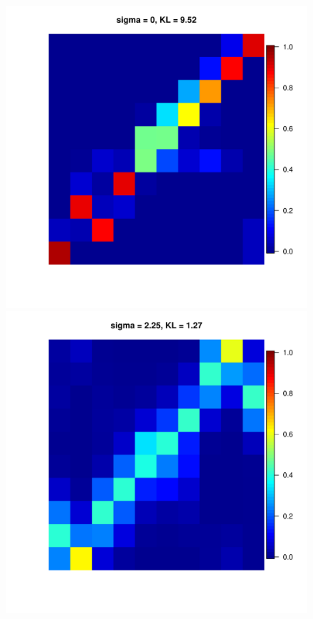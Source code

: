 \documentclass[11pt, oneside]{article}   	%
\begin{document}
\begin{figure}[h!]
{\begin{minipage}[t]{.3\textwidth}
		\end{minipage}
		\hfill
		\begin{minipage}[t]{.3\textwidth}
			\centering
			\includegraphics[width=\textwidth]{figures/Pseudo_alpha1dot5N100n100run1sd0.pdf}
			
		\end{minipage} 
		\hfill
		\begin{minipage}[t]{.3\textwidth}
			\centering
			\includegraphics[width=\textwidth]{figures/Pseudo_alpha1N100n100run1sd2dot25.pdf}
			

\end{minipage}}
\end{figure}
\end{document}
